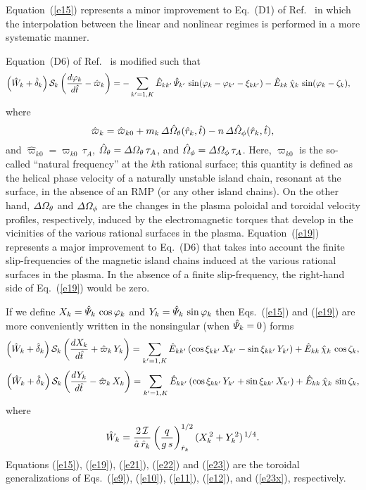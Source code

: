 \documentclass[12pt,prb,aps]{revtex4-1}
\begin{document}
Equation~(\ref{e15}) represents a minor improvement to Eq.~(D1) of Ref.~ in which the interpolation between the
linear and nonlinear regimes is performed in a more systematic manner. 

Equation~(D6) of Ref.~ is modified such that
\begin{align}\label{e19}
\left(\hat{W}_k +\hat{\delta}_k\right){\cal S}_k\left(\frac{d\varphi_k}{d\hat{t}}-\hat{\varpi}_k\right)&=
- \sum_{k'=1,K}\hat{E}_{kk'}\,\hat{\mit\Psi}_{k'}\,\sin(\varphi_k-\varphi_{k'}-\xi_{kk'})-\hat{E}_{kk}\,\hat{\chi}_k\,\sin(\varphi_k-\zeta_k),
\end{align}
where
\begin{equation}
\hat{\varpi}_k= \hat{\varpi}_{k0}+m_k\,{\mit\Delta}\hat{\mit\Omega}_\theta(\hat{r}_k,\hat{t})-n\,{\mit\Delta}\hat{\mit\Omega}_\phi(\hat{r}_k,\hat{t}),
\end{equation}
and $\hat{\varpi}_{k0}= \varpi_{k0}\,\tau_A$, $\hat{\mit\Omega}_\theta= {\mit\Delta}{\mit\Omega}_\theta\,\tau_A$, and $\hat{\mit\Omega}_\phi= {\mit\Delta}{\mit\Omega}_\phi\,\tau_A$. Here, $\varpi_{k0}$
is the so-called ``natural frequency'' at the $k$th rational surface; this quantity is defined as the helical phase velocity of a naturally unstable island chain, resonant at the surface, in the
absence of an RMP (or any other island chains). On the other hand,  ${\mit\Delta}{\mit\Omega}_\theta$ and ${\mit\Delta}{\mit\Omega}_\phi$ are the changes in the plasma
poloidal and toroidal velocity profiles, respectively, induced by the electromagnetic torques that develop in the vicinities of the various rational surfaces in the plasma.
Equation~(\ref{e19}) represents
a major improvement to Eq.~(D6) that takes into  account the finite slip-frequencies of the magnetic island chains induced at
the various rational surfaces in the plasma. In the absence of a finite slip-frequency, the right-hand side of Eq.~(\ref{e19}) would be zero. 

If we define $X_k = \hat{\mit\Psi}_k\,\cos\varphi_k$ and $Y_k=\hat{\mit\Psi}_k\,\sin\varphi_k$ then Eqs.~(\ref{e15}) and (\ref{e19}) are
more conveniently written in the nonsingular (when $\hat{\mit\Psi}_k=0$) forms
\begin{align}\label{e21}
\left(\hat{W}_k +\hat{\delta}_k\right){\cal S}_k\left(\frac{dX_k}{d\hat{t}} 
+\hat{\varpi}_k\,Y_k\right)= \sum_{k'=1,K}\hat{E}_{kk'}\,(\cos\xi_{kk'}\,X_{k'}  -\sin\xi_{kk'}\,Y_{k'}) + \hat{E}_{kk}\,\hat{\chi}_k\,\cos\zeta_k,\\[0.5ex]
\left(\hat{W}_k +\hat{\delta}_k\right){\cal S}_k\left(\frac{dY_k}{d\hat{t}} -\hat{\varpi}_k\,X_k\right)
= \sum_{k'=1,K}\hat{E}_{kk'}\,(\cos\xi_{kk'}\,Y_{k'}
+\sin\xi_{kk'}\,X_{k'}) + \hat{E}_{kk}\,\hat{\chi}_k\,\sin\zeta_k,\label{e22}
\end{align}
where
\begin{equation}\label{e23}
\hat{W}_k =\frac{2\,{\cal I}}{\hat{a}\,\hat{r}_k}\left(\frac{q}{g\,s}\right)^{1/2}_{\hat{r}_k} (X_k^{\,2} + Y_k^{\,2})^{\,1/4}.
\end{equation}
Equations (\ref{e15}), (\ref{e19}), (\ref{e21}), (\ref{e22}) and (\ref{e23}) are the toroidal generalizations of Eqs.~(\ref{e9}), (\ref{e10}), (\ref{e11}), (\ref{e12}), and (\ref{e23x}), respectively.
\end{document}
